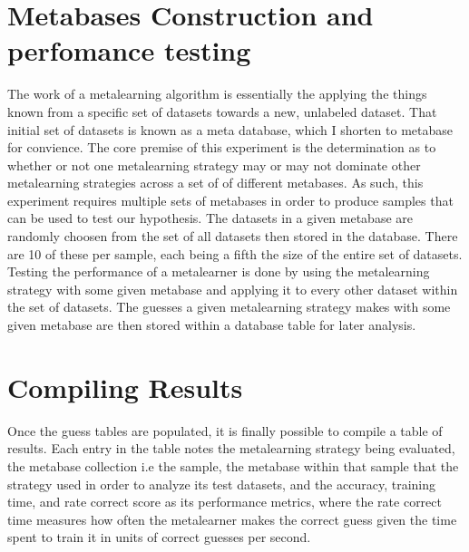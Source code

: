\section{Metabases Construction and perfomance testing}
The work of a metalearning algorithm is essentially the applying the things
known from a specific set of datasets towards a new, unlabeled dataset. That
initial set of datasets is known as a meta database, which I shorten to metabase
for convience. The core premise of this experiment is the determination as to
whether or not one metalearning strategy may or may not dominate other
metalearning strategies across a set of of different metabases. As such, this
experiment requires multiple sets of metabases in order to produce samples
that can be used to test our hypothesis. The datasets in a given metabase are
randomly choosen from the set of all datasets then stored in the database. There
are 10 of these per sample, each being a fifth the size of the entire set of
datasets. Testing the performance of a metalearner is done by using the
metalearning strategy with some given metabase and applying it to every other
dataset within the set of datasets. The guesses a given metalearning strategy
makes with some given metabase are then stored within a database table for later
analysis.

\section{Compiling Results}
Once the guess tables are populated, it is finally possible to compile a table
of results. Each entry in the table notes the metalearning strategy being
evaluated, the metabase collection i.e the sample, the metabase within that
sample that the strategy used in order to analyze its test datasets, and the
accuracy, training time, and rate correct score as its performance metrics,
where the rate correct time measures how often the metalearner makes the correct
guess given the time spent to train it in units of correct guesses per second.
